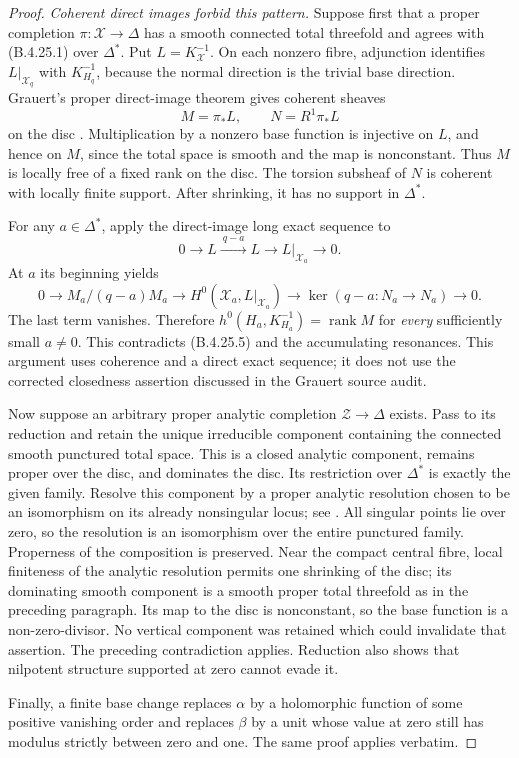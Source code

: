 \begin{proof}
\emph{Coherent direct images forbid this pattern.}
Suppose first that a proper completion
$\pi:\mathcal X\to\Delta$ has a smooth connected
total threefold and agrees with (B.4.25.1) over
$\Delta^*$. Put $L=K_{\mathcal X}^{-1}$.
On each nonzero fibre, adjunction identifies
$L|_{\mathcal X_q}$ with $K_{H_q}^{-1}$, because
the normal direction is the trivial base direction.
Grauert's proper direct-image theorem gives coherent
sheaves
\[
 M=\pi_*L,\qquad N=R^1\pi_*L
\]
on the disc
\citep[Section 6, Hauptsatz I, p.~59]{Grauert60push}.
Multiplication by a nonzero base function is injective
on $L$, and hence on $M$, since the total space is
smooth and the map is nonconstant. Thus $M$ is
locally free of a fixed rank on the disc. The torsion
subsheaf of $N$ is coherent with locally finite
support. After shrinking, it has no support in
$\Delta^*$.

For any $a\in\Delta^*$, apply the direct-image long
exact sequence to
\[
 0\longrightarrow L\xrightarrow{\ q-a\ }L
 \longrightarrow L|_{\mathcal X_a}\longrightarrow0.
\]
At $a$ its beginning yields
\[
 0\longrightarrow M_a/(q-a)M_a
 \longrightarrow H^0(\mathcal X_a,L|_{\mathcal X_a})
 \longrightarrow \ker(q-a:N_a\to N_a)
 \longrightarrow0.                                   \tag{B.4.25.6}
\]
The last term vanishes. Therefore
$h^0(H_a,K_{H_a}^{-1})=\operatorname{rank}M$ for
\emph{every} sufficiently small $a\ne0$. This
contradicts (B.4.25.5) and the accumulating resonances.
This argument uses coherence and a direct exact
sequence; it does not use the corrected closedness
assertion discussed in the Grauert source audit.

Now suppose an arbitrary proper analytic completion
$\mathcal Z\to\Delta$ exists. Pass to its reduction
and retain the unique irreducible component containing
the connected smooth punctured total space. This is a
closed analytic component, remains proper over the
disc, and dominates the disc. Its restriction over
$\Delta^*$ is exactly the given family. Resolve this
component by a proper analytic resolution chosen to
be an isomorphism on its already nonsingular locus;
see \citet[Theorem 1.6 and the noncompact analytic
extension immediately following it]{BM95AB}.
All singular points lie over zero, so the resolution
is an isomorphism over the entire punctured family.
Properness of the composition is preserved. Near the
compact central fibre, local finiteness of the
analytic resolution permits one shrinking of the
disc; its dominating smooth component is a smooth
proper total threefold as in the preceding paragraph.
Its map to the disc is nonconstant, so the base
function is a non-zero-divisor. No vertical component
was retained which could invalidate that assertion.
The preceding contradiction applies. Reduction also
shows that nilpotent structure supported at zero
cannot evade it.

Finally, a finite base change replaces $\alpha$ by
a holomorphic function of some positive vanishing
order and replaces $\beta$ by a unit whose value
at zero still has modulus strictly between zero and
one. The same proof applies verbatim.
\end{proof}

